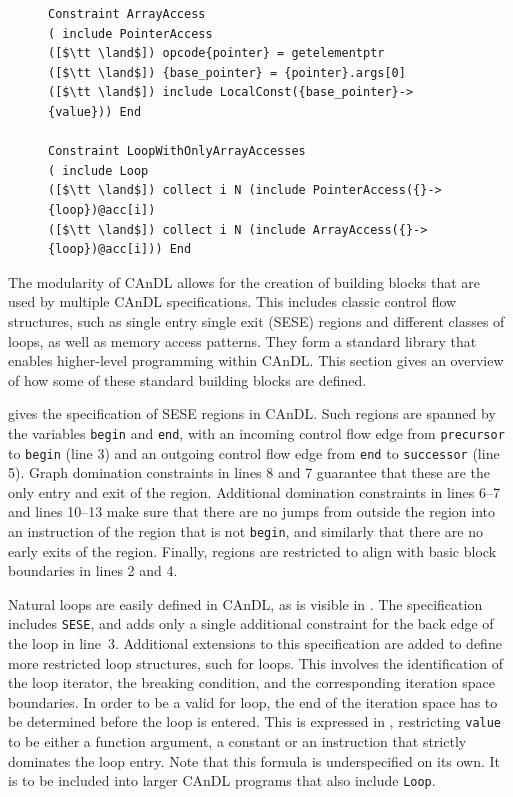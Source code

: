 \begin{figure}[p]
\begin{lstlisting}
Constraint ArrayAccess
( include PointerAccess
([$\tt \land$]) opcode{pointer} = getelementptr
([$\tt \land$]) {base_pointer} = {pointer}.args[0]
([$\tt \land$]) include LocalConst({base_pointer}->{value})) End

Constraint LoopWithOnlyArrayAccesses
( include Loop
([$\tt \land$]) collect i N (include PointerAccess({}->{loop})@acc[i])
([$\tt \land$]) collect i N (include ArrayAccess({}->{loop})@acc[i])) End
\end{lstlisting}
\end{figure}

    The modularity of CAnDL allows for the creation of building blocks that are
    used by multiple CAnDL specifications.
    This includes classic control flow structures, such as single entry single
    exit (SESE) regions and different classes of loops, as well as memory access
    patterns.
    They form a standard library that enables higher-level programming
    within CAnDL.
    This section gives an overview of how some of these standard building
    blocks are defined.

     gives the specification of SESE regions in CAnDL.
    Such regions are spanned by the variables {\tt begin} and {\tt end}, with an
    incoming control flow edge from {\tt precursor} to {\tt begin} (line 3) and
    an outgoing control flow edge from {\tt end} to {\tt successor} (line 5).
    Graph domination constraints in lines 8 and 7 guarantee that these are the
    only entry and exit of the region.
    Additional domination constraints in lines 6--7 and lines 10--13 make sure
    that there are no jumps from outside the region into an instruction of the
    region that is not {\tt begin}, and similarly that there are no early exits
    of the region.
    Finally, regions are restricted to align with basic block boundaries in
    lines 2 and 4.

    Natural loops are easily defined in CAnDL, as is visible in
    .
    The specification includes {\tt SESE}, and adds only a single additional
    constraint for the back edge of the loop in line~3.
    Additional extensions to this specification are added to define more
    restricted loop structures, such for loops.
    This involves the identification of the loop iterator, the breaking
    condition, and the corresponding iteration space boundaries.
    In order to be a valid for loop, the end of the iteration space has to be
    determined before the loop is entered.
    This is expressed in , restricting {\tt value} to be
    either a function argument, a constant or an instruction that strictly
    dominates the loop entry.
    Note that this formula is underspecified on its own.
    It is to be included into larger CAnDL programs that also include
    {\tt Loop}.

